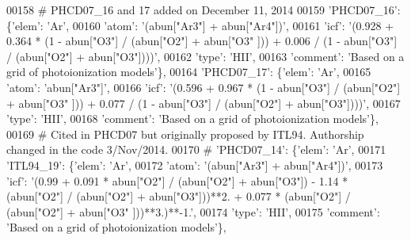 \begin{DoxyCode}
00158 \textcolor{comment}{# PHCD07\_16 and 17 added on December 11, 2014}
00159                          \textcolor{stringliteral}{'PHCD07\_16'}: \{\textcolor{stringliteral}{'elem'}: \textcolor{stringliteral}{'Ar'},
00160                                        \textcolor{stringliteral}{'atom'}: \textcolor{stringliteral}{'(abun["Ar3"] + abun["Ar4"])'},
00161                                        \textcolor{stringliteral}{'icf'}: \textcolor{stringliteral}{'(0.928 + 0.364 * (1 - abun["O3"] / (abun["O2"] + abun["O3"
      ])) + 0.006 / (1 - abun["O3"] / (abun["O2"] + abun["O3"])))'},
00162                                        \textcolor{stringliteral}{'type'}: \textcolor{stringliteral}{'HII'},
00163                                        \textcolor{stringliteral}{'comment'}: \textcolor{stringliteral}{'Based on a grid of photoionization models'}\},
00164                          \textcolor{stringliteral}{'PHCD07\_17'}: \{\textcolor{stringliteral}{'elem'}: \textcolor{stringliteral}{'Ar'},
00165                                        \textcolor{stringliteral}{'atom'}: \textcolor{stringliteral}{'abun["Ar3"]'},
00166                                        \textcolor{stringliteral}{'icf'}: \textcolor{stringliteral}{'(0.596 + 0.967 * (1 - abun["O3"] / (abun["O2"] + abun["O3"
      ])) + 0.077 / (1 - abun["O3"] / (abun["O2"] + abun["O3"])))'},
00167                                        \textcolor{stringliteral}{'type'}: \textcolor{stringliteral}{'HII'},
00168                                        \textcolor{stringliteral}{'comment'}: \textcolor{stringliteral}{'Based on a grid of photoionization models'}\},
00169 \textcolor{comment}{# Cited in PHCD07 but originally proposed by ITL94. Authorship changed in the code 3/Nov/2014. }
00170 \textcolor{comment}{#                         'PHCD07\_14': \{'elem': 'Ar',}
00171                          \textcolor{stringliteral}{'ITL94\_19'}: \{\textcolor{stringliteral}{'elem'}: \textcolor{stringliteral}{'Ar'},
00172                                        \textcolor{stringliteral}{'atom'}: \textcolor{stringliteral}{'(abun["Ar3"] + abun["Ar4"])'},
00173                                        \textcolor{stringliteral}{'icf'}: \textcolor{stringliteral}{'(0.99 + 0.091 * abun["O2"] / (abun["O2"] + abun["O3"]) -
       1.14 * (abun["O2"] / (abun["O2"] + abun["O3"]))**2. + 0.077 * (abun["O2"] / (abun["O2"] + abun["O3"
      ]))**3.)**-1.'},
00174                                        \textcolor{stringliteral}{'type'}: \textcolor{stringliteral}{'HII'},
00175                                        \textcolor{stringliteral}{'comment'}: \textcolor{stringliteral}{'Based on a grid of photoionization models'}\},

\end{DoxyCode}
